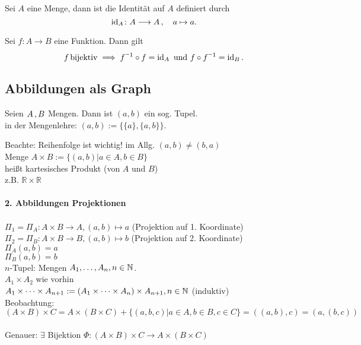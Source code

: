\documentclass[../ana1.tex]{subfiles}
\begin{document}
\begin{defi*}[Identitätsabbildung]
	Sei \(A\) eine Menge, dann ist die Identität auf \(A\) definiert durch
	\[\operatorname{id}_{A} \colon A \longrightarrow A \operatorname{,} \quad a \mapsto a.\]
\end{defi*}


\begin{bem}
	Sei \(f \colon A \longrightarrow B\) eine Funktion. Dann gilt
	\[f \bijektiv \implies \inverse{f} \circ f = \id_{A} \text{ und } f \circ \inverse{f} = \id_{B}.\]
\end{bem}


\subsection{Abbildungen als Graph}

\begin{defi}
	Seien \(A \operatorname{,} B\) Mengen. Dann ist $(a,b)$ ein sog. Tupel.\\
	in der Mengenlehre: $(a,b) := \{\{a\}, \{a,b\}\}$.
\end{defi}

Beachte: Reihenfolge ist wichtig! im Allg. $(a,b)\neq (b,a)$\\
Menge $A\times B := \{(a,b)|a\in A, b\in B\}$\\
heißt kartesisches Produkt (von $A$ und $B$)\\
z.B. $\mathbb{R}\times\mathbb{R}$\\
\\
\textbf{2. Abbildungen Projektionen}\\
\\
\(\Pi_1 = \Pi_A : A\times B \rightarrow A, (a,b)\mapsto a\) (Projektion auf 1. Koordinate)\\
\(\Pi_2 = \Pi_B : A\times B \rightarrow B, (a,b) \mapsto b\) (Projektion auf 2. Koordinate)\\
\(\Pi_A(a,b) = a\) \\
\(\Pi_B(a,b) = b\) \\
\(n\)-Tupel: Mengen \(A_1,\dots ,A_n, n\in \mathbb{N} \).\\
\(A_1\times A_2\) wie vorhin\\
\(A_1\times\cdots\times A_{n+1} := (A_1\times\cdots\times A_n)\times A_{n+1}, n\in \mathbb{N} \) (induktiv)\\
Beobachtung:\\
\[ (A\times B)\times C = A\times (B\times C) + \{(a,b,c)|a\in A, b\in B, c\in C\} = ((a,b),c) = (a,(b,c))\] \\
Genauer: \( \exists \) Bijektion \(\Phi : (A\times B) \times C \rightarrow A\times (B\times C)\)
\end{document}
